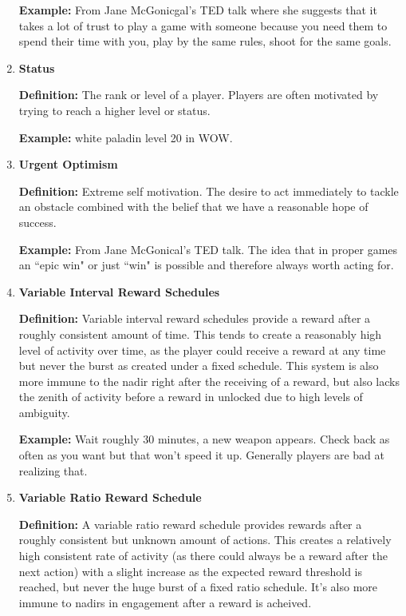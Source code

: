 \begin{enumerate}
\textbf{Example:} From Jane McGonicgal’s TED talk where she suggests that it takes a lot of trust to play a game with someone because you need them to spend their time with you, play by the same rules, shoot for the same goals.

\item \textbf{Status}

\textbf{Definition:} The rank or level of a player. Players are often motivated by trying to reach a higher level or status.

\textbf{Example:} white paladin level 20 in WOW.

\item \textbf{Urgent Optimism}

\textbf{Definition:} Extreme self motivation. The desire to act immediately to tackle an obstacle combined with the belief that we have a reasonable hope of success.

\textbf{Example:} From Jane McGonical’s TED talk. The idea that in proper games an ``epic win" or just ``win" is possible and therefore always worth acting for.

\item \textbf{Variable Interval Reward Schedules}

\textbf{Definition:} Variable interval reward schedules provide a reward after a roughly consistent amount of time. This tends to create a reasonably high level of activity over time, as the player could receive a reward at any time but never the burst as created under a fixed schedule. This system is also more immune to the nadir right after the receiving of a reward, but also lacks the zenith of activity before a reward in unlocked due to high levels of ambiguity.

\textbf{Example:} Wait roughly 30 minutes, a new weapon appears. Check back as often as you want but that won’t speed it up. Generally players are bad at realizing that.

\item \textbf{Variable Ratio Reward Schedule}

\textbf{Definition:} A variable ratio reward schedule provides rewards after a roughly consistent but unknown amount of actions. This creates a relatively high consistent rate of activity (as there could always be a reward after the next action) with a slight increase as the expected reward threshold is reached, but never the huge burst of a fixed ratio schedule. It’s also more immune to nadirs in engagement after a reward is acheived.


\end{enumerate}
